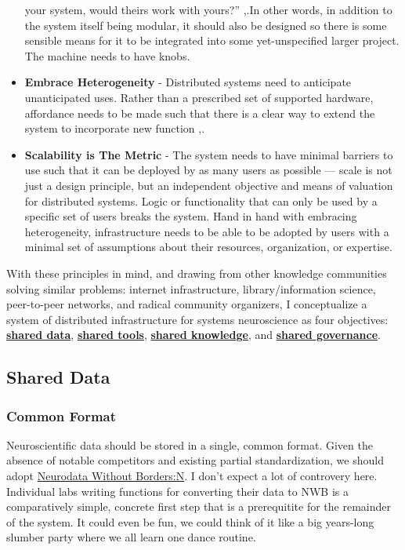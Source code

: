 \documentclass[nohyper]{tufte-book-jls}
\begin{document}
\begin{itemize}
  your system, would theirs work with yours?'' \cite{berners-leePrinciplesDesign1998},.In other words, in addition to
  the system itself being modular, it should also be designed so there
  is some sensible means for it to be integrated into some
  yet-unspecified larger project. The machine needs to have knobs.
\item
  \textbf{Embrace Heterogeneity} - Distributed systems need to
  anticipate unanticipated uses. Rather than a prescribed set of
  supported hardware, affordance needs to be made such that there is a
  clear way to extend the system to incorporate new function \cite{carpenterRFC1958Architectural1996},.\item
  \textbf{Scalability is The Metric} - The system needs to have minimal
  barriers to use such that it can be deployed by as many users as
  possible --- scale is not just a design principle, but an independent
  objective and means of valuation for distributed systems. Logic or
  functionality that can only be used by a specific set of users breaks
  the system. Hand in hand with embracing heterogeneity, infrastructure
  needs to be able to be adopted by users with a minimal set of
  assumptions about their resources, organization, or expertise.
\end{itemize}

With these principles in mind, and drawing from other knowledge
communities solving similar problems: internet infrastructure,
library/information science, peer-to-peer networks, and radical
community organizers, I conceptualize a system of distributed
infrastructure for systems neuroscience as four objectives:
\protect\hyperlink{shared-data}{\textbf{shared data}},
\protect\hyperlink{shared-tools}{\textbf{shared tools}},
\protect\hyperlink{shared-knowledge}{\textbf{shared knowledge}}, and
\protect\hyperlink{shared-governance}{\textbf{shared governance}}.

\hypertarget{shared-data}{%
\subsection{Shared Data}\label{shared-data}}

\hypertarget{common-format}{%
\subsubsection{Common Format}\label{common-format}}

Neuroscientific data should be stored in a single, common format. Given
the absence of notable competitors and existing partial standardization,
we should adopt \href{rubelNWBAccessibleData2019a}{Neurodata Without
Borders:N}. I don't expect a lot of controvery here. Individual labs writing
functions for converting their data to NWB is a comparatively simple,
concrete first step that is a prerequitite for the remainder of the
system. It could even be fun, we could think of it like a big years-long
slumber party where we all learn one dance routine.
\end{document}

